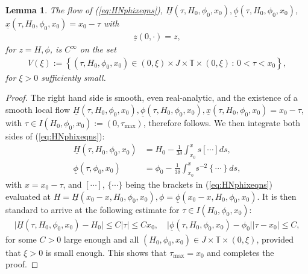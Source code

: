 \documentclass[reqno,12pt]{amsart}
\newcommand{\eqlab}[1]{\label{eq:#1}}
\renewcommand{\eqref}[1]{(\ref{eq:#1})}
\newcommand{\lemmalab}[1]{\label{lemma:#1}}
\newtheorem{lemma}[theorem]{Lemma}
\numberwithin{equation}{section}
\begin{document}
\begin{lemma}\lemmalab{H0phi0}
 The flow of \eqref{HNphixeqns}, $\underline H(\tau,H_0,\phi_0,x_0),\underline \phi(\tau,H_0,\phi_0,x_0)$, $\underline x(\tau,H_0,\phi_0,x_0)=x_0-\tau$ with 
 \begin{align*}
  \underline z(0,\cdot)=z,
 \end{align*}
for $z=H,\phi$, is $C^\infty$ on the set 
\begin{align}\eqlab{Vxi}
V(\xi):=\left\{(\tau,H_0,\phi_0,x_0) \in (0,\xi)\times J\times \mathbb T\times  (0,\xi)\,:\,0<\tau<x_0\right\},
\end{align} for $\xi>0$ sufficiently small. 
\end{lemma}
\begin{proof}
The right hand side is smooth, even real-analytic, and the existence of a smooth local flow $\underline H(\tau,H_0,\phi_0,x_0),\underline \phi(\tau,H_0,\phi_0,x_0),\underline x(\tau,H_0,\phi_0,x_0)=x_0-\tau$, with $\tau\in I(H_0,\phi_0,x_0):=(0,\tau_{\text{max}})$, therefore follows. 
We then integrate both sides of \eqref{HNphixeqns}:
\begin{align}
 \underline H(\tau,H_0,\phi_0,x_0) &=H_0-\frac{1}{3\delta}\int_{x_0}^x s \left[\cdots \right]ds,\eqlab{underlineH}\\
 \underline \phi(\tau,\phi_0,x_0)&=\phi_0 -\frac{1}{3\delta}\int_{x_0}^x s^{-2} \left\{\cdots \right\}ds,\nonumber
\end{align}
with $x=x_0-\tau$, and $[\cdots]$, $\{\cdots\}$ being the brackets in  \eqref{HNphixeqns} evaluated at $H=\underline H(x_0-x,H_0,\phi_0,x_0),\phi=\underline \phi(x_0-x,H_0,\phi_0,x_0)$.
It is then standard to arrive at the following estimate for $\tau\in I(H_0,\phi_0,x_0)$:
\begin{align}
 \vert \underline H(\tau,H_0,\phi_0,x_0)-H_0\vert \le  C\vert \tau\vert\le C x_0, \quad \vert \underline \phi(\tau,H_0,\phi_0,x_0) -\phi_0\vert \vert \tau-x_0\vert \le C,\eqlab{Hphibound}
\end{align}
for some $C>0$ large enough and all $(H_0,\phi_0,x_0)\in J\times \mathbb T\times (0,\xi)$, provided that $\xi>0$ is small enough. This shows that $\tau_{\text{max}}=x_0$ and completes the proof. 
%  

%   

 
\end{proof}
\end{document}
